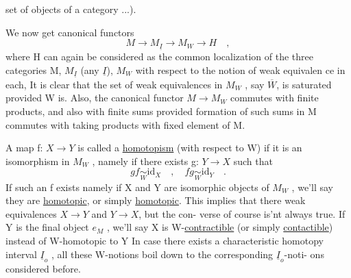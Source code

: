 set of objects of a category ...).

We now get canonical functors
\[ M\longrightarrow M_{\underline{I}} \to M_W \to H \quad , \]
where H can again be considered as the common localization of the three
categories M, $M_{\underline{I}}$ (any $\underline{I}$), $M_W$ with respect to the notion of weak equivalen%
ce in each, It is clear that the set of weak equivalences in $M_W$ , say $\overline{W}$,
is saturated provided W is. Also, the canonical functor $M\to M_W$ commutes
with finite products, and also with finite sums provided formation of
such sums in M commutes with taking products with  fixed element of M.

A map f: $X\to Y$ is called a  \uline{homotopism} (with respect to W) if it is
an isomorphism in $M_W$ , namely if there exists g: $Y\to X$ such that
\[ gf \underset{W}{\sim} \mathrm{id}_X \quad , \quad fg \underset{W}{\sim} \mathrm{id}_Y \quad . \]
 If such an f exists namely if X and Y are isomorphic
objects of $M_W$ , we'll say they are \uline{homotopic}, or simply \uline{homotopic}. This
implies that there  weak equivalences $X\to Y$ and $Y\to X$, but the con-%
verse of course is'nt always true. If Y is the final object $e_M$ , we'll
say X is W-\uline{contractible} (or simply \uline{contactible})  instead of
W-homotopic to Y In case there exists a characteristic homotopy
interval $\underline{I}_o$ , all these W-notions boil down to the corresponding $\underline{I}_o$-noti-%
ons considered before.

